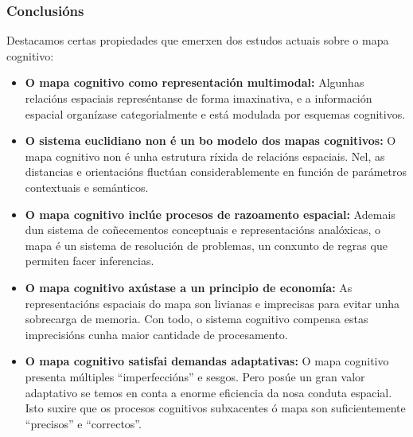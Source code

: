 \documentclass[a4paper,11pt]{article}
\begin{document}
\subsubsection{Conclusións}
Destacamos certas propiedades que emerxen dos estudos actuais sobre o mapa cognitivo:
\begin{itemize}
	\item \textbf{O mapa cognitivo como representación multimodal:} Algunhas relacións espaciais 
	represéntanse de forma imaxinativa, e a información espacial organízase categorialmente e está 
	modulada por esquemas cognitivos. 
	\item \textbf{O sistema euclidiano non é un bo modelo dos mapas cognitivos:} O mapa cognitivo 
	non é unha estrutura ríxida de relacións espaciais. Nel, as distancias e orientacións fluctúan 
	considerablemente en función de parámetros contextuais e semánticos.
	\item \textbf{O mapa cognitivo inclúe procesos de razoamento espacial:} Ademais dun sistema de 
	coñecementos conceptuais e representacións analóxicas, o mapa é un sistema de resolución de 
	problemas, un conxunto de regras que permiten facer inferencias.
	\item \textbf{O mapa cognitivo axústase a un principio de economía:} As representacións 
	espaciais do mapa son livianas e imprecisas para evitar unha sobrecarga de memoria. Con todo, o 
	sistema cognitivo compensa estas imprecisións cunha maior cantidade de procesamento.
	\item \textbf{O mapa cognitivo satisfai demandas adaptativas:} O mapa cognitivo presenta 
	múltiples ``imperfeccións'' e sesgos. Pero posúe un gran valor adaptativo se temos en conta a 
	enorme eficiencia da nosa conduta espacial. Isto suxire que os procesos cognitivos subxacentes ó 
	mapa son suficientemente ``precisos'' e ``correctos''.
\end{itemize}
\end{document}
